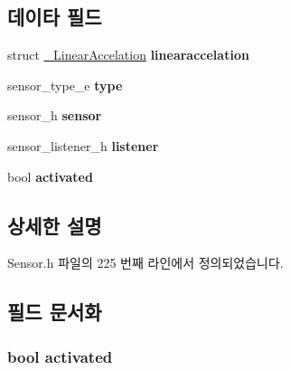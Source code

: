 \subsection*{데이타 필드}
\begin{DoxyCompactItemize}
\item 
\hypertarget{struct__LinearAccelationExtend_a12d1cee667dc4d73c2096e6e7b9951bf}{struct \hyperlink{struct__LinearAccelation}{\-\_\-\-Linear\-Accelation} {\bfseries linearaccelation}}\label{struct__LinearAccelationExtend_a12d1cee667dc4d73c2096e6e7b9951bf}

\item 
\hypertarget{struct__LinearAccelationExtend_abffb09766da2fc510a79bb51f82a36e1}{sensor\-\_\-type\-\_\-e {\bfseries type}}\label{struct__LinearAccelationExtend_abffb09766da2fc510a79bb51f82a36e1}

\item 
\hypertarget{struct__LinearAccelationExtend_a5bae9b7801bc3808411925cde81d3f26}{sensor\-\_\-h {\bfseries sensor}}\label{struct__LinearAccelationExtend_a5bae9b7801bc3808411925cde81d3f26}

\item 
\hypertarget{struct__LinearAccelationExtend_aa977dfb866b24fd7d9a20a9a01b2fd1f}{sensor\-\_\-listener\-\_\-h {\bfseries listener}}\label{struct__LinearAccelationExtend_aa977dfb866b24fd7d9a20a9a01b2fd1f}

\item 
\hypertarget{struct__LinearAccelationExtend_a73e9fa0c3543560192f38a8ab6a78c47}{bool {\bfseries activated}}\label{struct__LinearAccelationExtend_a73e9fa0c3543560192f38a8ab6a78c47}

\end{DoxyCompactItemize}


\subsection{상세한 설명}


Sensor.\-h 파일의 225 번째 라인에서 정의되었습니다.



\subsection{필드 문서화}
\hypertarget{struct__LinearAccelationExtend_a73e9fa0c3543560192f38a8ab6a78c47}{
\subsubsection[{activated}]{\setlength{\rightskip}{0pt plus 5cm}bool activated}}\label{struct__LinearAccelationExtend_a73e9fa0c3543560192f38a8ab6a78c47}


